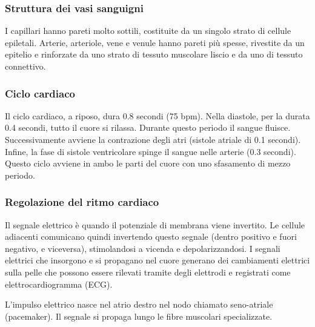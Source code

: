 \documentclass[a4paper]{article}
\begin{document}
\subsubsection{Struttura dei vasi sanguigni}

I capillari hanno pareti molto sottili, costituite da un singolo strato di cellule epiletali.
Arterie, arteriole, vene e venule hanno pareti più spesse, rivestite da un epitelio e rinforzate da uno strato di tessuto muscolare liscio e da uno di tessuto connettivo.


\subsubsection{Ciclo cardiaco}

Il ciclo cardiaco, a riposo, dura 0.8 secondi (75 bpm).
Nella diastole, per la durata 0.4 secondi, tutto il cuore si rilassa.
Durante questo periodo il sangue fluisce.
Successivamente avviene la contrazione degli atri (sistole atriale di 0.1 secondi).
Infine, la fase di sistole ventricolare spinge il sangue nelle arterie (0.3 secondi).
Questo ciclo avviene in ambo le parti del cuore con uno sfasamento di mezzo periodo.

\subsubsection{Regolazione del ritmo cardiaco}

Il segnale elettrico è quando il potenziale di membrana viene invertito.
Le cellule adiacenti comunicano quindi invertendo questo segnale (dentro positivo e fuori negativo, e viceversa),
stimolandosi a vicenda e depolarizzandosi.
I segnali elettrici che insorgono e si propagano nel cuore generano dei
cambiamenti elettrici sulla pelle che possono essere rilevati tramite degli
elettrodi e registrati come elettrocardiogramma (ECG).

L'impulso elettrico nasce nel atrio destro nel nodo chiamato seno-atriale (pacemaker).
Il segnale si propaga lungo le fibre muscolari specializzate.

\end{document}
